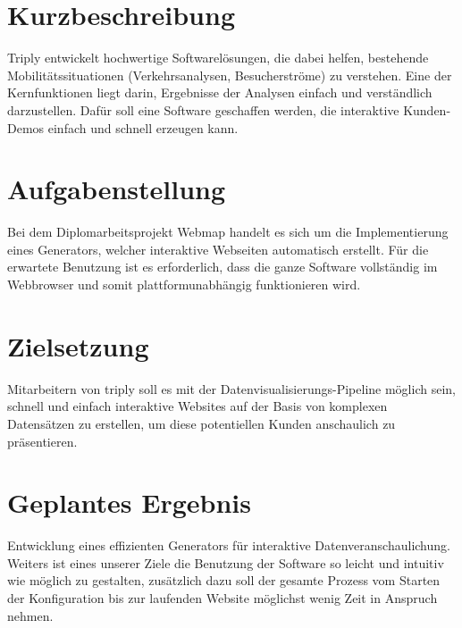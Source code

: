 \section{Kurzbeschreibung}
Triply entwickelt hochwertige Softwarelösungen, die dabei helfen, bestehende Mobilitätssituationen (Verkehrsanalysen,
Besucherströme) zu verstehen.
Eine der Kernfunktionen liegt darin, Ergebnisse der Analysen einfach und verständlich
darzustellen.
Dafür soll eine Software geschaffen werden, die interaktive Kunden-Demos einfach und schnell erzeugen kann.

\section{Aufgabenstellung}
Bei dem Diplomarbeitsprojekt Webmap handelt es sich um die Implementierung eines Generators, welcher interaktive
Webseiten automatisch erstellt.
Für die erwartete Benutzung ist es erforderlich, dass die ganze Software vollständig im Webbrowser
und somit plattformunabhängig funktionieren wird.

\section{Zielsetzung}
Mitarbeitern von triply soll es mit der Datenvisualisierungs-Pipeline möglich sein, schnell und einfach
interaktive Websites auf der Basis von komplexen Datensätzen zu erstellen, um diese potentiellen Kunden
anschaulich zu präsentieren.

\section{Geplantes Ergebnis}
Entwicklung eines effizienten Generators für interaktive Datenveranschaulichung.
Weiters ist eines unserer Ziele die Benutzung der Software so leicht und intuitiv wie möglich zu gestalten,
zusätzlich dazu soll der gesamte
Prozess vom Starten der Konfiguration bis zur laufenden Website möglichst wenig Zeit in Anspruch nehmen.